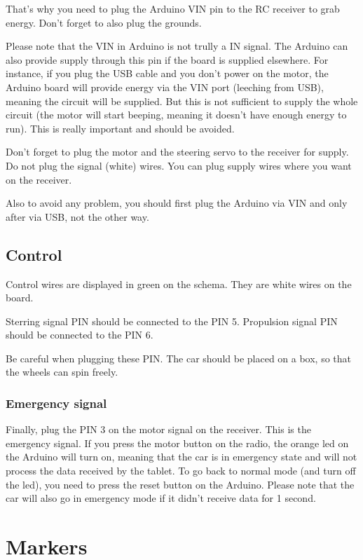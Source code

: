 \documentclass[a4paper,11pt]{report}
\begin{document}
That's why you need to plug the Arduino VIN pin to the RC receiver to grab
energy. Don't forget to also plug the grounds.

Please note that the VIN in Arduino is not trully a IN signal. The Arduino can
also provide supply through this pin if the board is supplied elsewhere. For
instance, if you plug the USB cable and you don't power on the motor, the
Arduino board will provide energy via the VIN port (leeching from USB), meaning
the circuit will be supplied. But this is not sufficient to supply the whole
circuit (the motor will start beeping, meaning it doesn't have enough energy to
run). This is really important and should be avoided.

Don't forget to plug the motor and the steering servo to the receiver for
supply. Do not plug the signal (white) wires. You can plug supply wires where
you want on the receiver.

Also to avoid any problem, you should first plug the Arduino via VIN and only
after via USB, not the other way.

\subsection{Control}

Control wires are displayed in green on the schema. They are white wires on the
board.

Sterring signal PIN should be connected to the PIN 5.
Propulsion signal PIN should be connected to the PIN 6.

Be careful when plugging these PIN. The car should be placed on a box, so that
the wheels can spin freely.

\subsubsection{Emergency signal}

Finally, plug the PIN 3 on the motor signal on the receiver. This is the
emergency signal. If you press the motor button on the radio, the orange led on
the Arduino will turn on, meaning that the car is in emergency state and will not
process the data received by the tablet. To go back to normal mode (and turn
off the led), you need to press the reset button on the Arduino. Please note
that the car will also go in emergency mode if it didn't receive data for 1
second.

\section{Markers}
\end{document}
